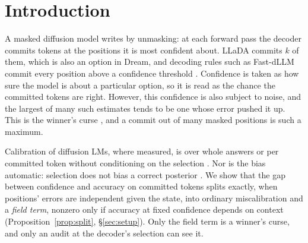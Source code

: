 %
%

\section{Introduction}
\label{sec:intro}

A masked diffusion model writes by unmasking: at each forward pass the decoder
commits tokens at the positions it is most confident about.
LLaDA commits $k$ of them, which is also an option in Dream,
and decoding rules such as Fast-dLLM commit every position above a confidence threshold \citep{nie2025llada,ye2025dream,chang2022maskgit,wu2025fastdllm}.
Confidence is taken as how sure the model is about a particular option,
so it is read as the chance the committed tokens are right.
However, this confidence is also subject to noise, and the largest of many such estimates
tends to be one whose error pushed it up.
This is the winner's curse \citep{andrews2024winners}, and a commit out of many masked positions is such a maximum.

Calibration of diffusion LMs, where measured, is over whole answers
\citep{yadav2026bidirectional,jiang2026bayeser} or per committed token without conditioning on
the selection \citep{asaria2026diffusiongemma}. Nor is the bias automatic: selection does not bias a correct posterior
\citep{dawid1994selection,efron2011tweedie}. We show that the gap between confidence and accuracy on committed
tokens splits exactly, when positions' errors are independent given the state, into ordinary
miscalibration and a \emph{field term}, nonzero only if
accuracy at fixed confidence depends on context (Proposition~\ref{prop:split},
\S\ref{sec:setup}). Only the field term is a winner's curse, and only an audit at the
decoder's selection can see it.

